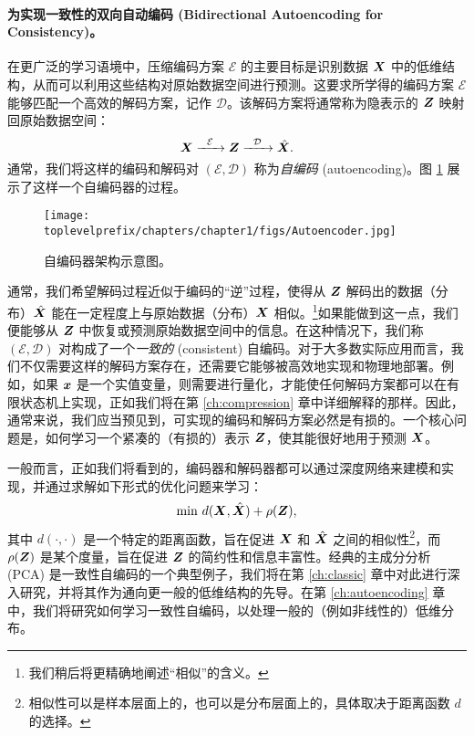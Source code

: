 \documentclass[../../book-main.tex]{subfiles}
\begin{document}
\paragraph{为实现一致性的双向自动编码 (Bidirectional Autoencoding for Consistency)。}
在更广泛的学习语境中，压缩编码方案 $\mathcal{E}$ 的主要目标是识别数据 $\bm{X}$ 中的低维结构，从而可以利用这些结构对原始数据空间进行预测。这要求所学得的编码方案 $\mathcal{E}$ 能够匹配一个高效的解码方案，记作 $\mathcal{D}$。该解码方案将通常称为隐表示的 $\bm{Z}$ 映射回原始数据空间：
\begin{equation}
    \bm{X}   \xrightarrow{\hspace{2mm} \mathcal{E}\hspace{2mm}} \bm{Z}  \xrightarrow{\hspace{2mm} \mathcal{D} \hspace{2mm}} \hat {\bm{X}}.
       \label{eqn:auto-encoding}
\end{equation}
通常，我们将这样的编码和解码对 $(\mathcal{E}, \mathcal{D})$ 称为{\em 自编码} (autoencoding)。图 \ref{fig:autoencoder}
展示了这样一个自编码器的过程。
\begin{figure}
    \centering
    \texttt{[image: \\toplevelprefix/chapters/chapter1/figs/Autoencoder.jpg]}
    \caption{自编码器架构示意图。}
    \label{fig:autoencoder}
\end{figure}


通常，我们希望解码过程近似于编码的“逆”过程，使得从 $\bm{Z}$ 解码出的数据（分布）$\hat {\bm{X}}$ 能在一定程度上与原始数据（分布）$\bm{X}$ 相似。\footnote{我们稍后将更精确地阐述“相似”的含义。}如果能做到这一点，我们便能够从 $\bm{Z}$ 中恢复或预测原始数据空间中的信息。在这种情况下，我们称 $(\mathcal{E}, \mathcal{D})$ 对构成了一个{\em 一致的} (consistent) 自编码。对于大多数实际应用而言，我们不仅需要这样的解码方案存在，还需要它能够被高效地实现和物理地部署。例如，如果 $\bm{x}$ 是一个实值变量，则需要进行量化，才能使任何解码方案都可以在有限状态机上实现，正如我们将在第 \ref{ch:compression} 章中详细解释的那样。因此，通常来说，我们应当预见到，可实现的编码和解码方案必然是有损的。一个核心问题是，如何学习一个紧凑的（有损的）表示 $\bm{Z}$，使其能很好地用于预测 $\bm{X}$。

一般而言，正如我们将看到的，编码器和解码器都可以通过深度网络来建模和实现，并通过求解如下形式的优化问题来学习：
\begin{equation}
   \min \, d( \bm{X}, \hat {\bm{X}}) + \rho(\bm{Z}), 
   \label{eqn:auto-encoding-objective}
\end{equation}
其中 $d(\cdot, \cdot)$ 是一个特定的距离函数，旨在促进 $\bm{X}$ 和 $\hat {\bm{X}}$ 之间的相似性\footnote{相似性可以是样本层面上的，也可以是分布层面上的，具体取决于距离函数 $d$ 的选择。}，而 $\rho(\bm{Z})$ 是某个度量，旨在促进 $\bm{Z}$ 的简约性和信息丰富性。经典的主成分分析 (PCA) \cite{JolliffeI2002} 是一致性自编码的一个典型例子，我们将在第 \ref{ch:classic} 章中对此进行深入研究，并将其作为通向更一般的低维结构的先导。在第 \ref{ch:autoencoding} 章中，我们将研究如何学习一致性自编码，以处理一般的（例如非线性的）低维分布。
\end{document}
